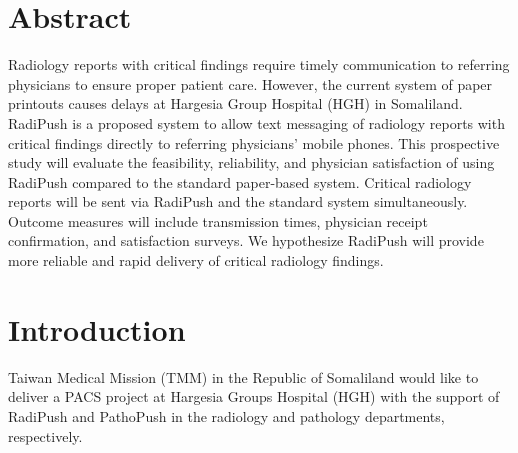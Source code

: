 \documentclass{article}
\begin{document}
\section{Abstract}
Radiology reports with critical findings require timely communication to referring physicians to ensure proper patient care. However, the current system of paper printouts causes delays at Hargesia Group Hospital (HGH) in Somaliland. RadiPush is a proposed system to allow text messaging of radiology reports with critical findings directly to referring physicians' mobile phones. This prospective study will evaluate the feasibility, reliability, and physician satisfaction of using RadiPush compared to the standard paper-based system. Critical radiology reports will be sent via RadiPush and the standard system simultaneously. Outcome measures will include transmission times, physician receipt confirmation, and satisfaction surveys. We hypothesize RadiPush will provide more reliable and rapid delivery of critical radiology findings.


\section{Introduction}

Taiwan Medical Mission (TMM) in the Republic of Somaliland would like to deliver a PACS project at Hargesia Groups Hospital (HGH) with the support of RadiPush and PathoPush in the radiology and pathology departments, respectively.
\end{document}
